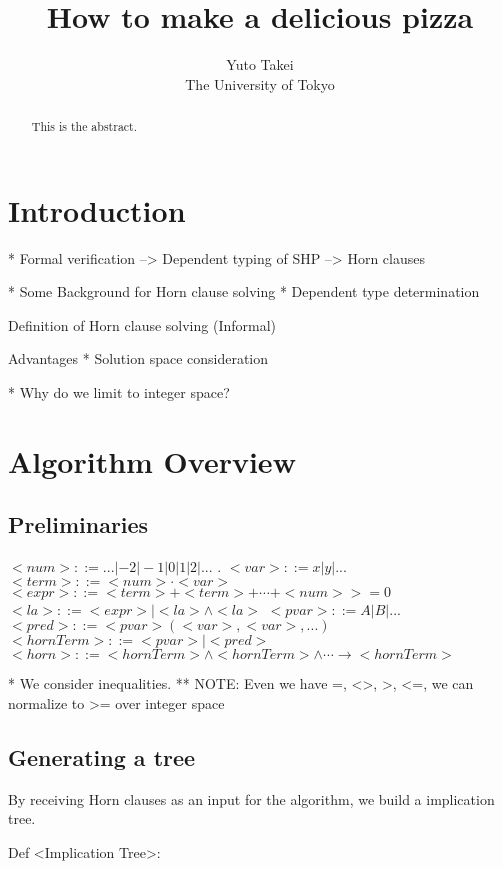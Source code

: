 \documentclass[a4paper,12pt]{article}
\title{How to make a delicious pizza}
\author{Yuto Takei \\ The University of Tokyo}
\begin{document}
\maketitle

\begin{abstract}
  This is the abstract.
\end{abstract}

\section{Introduction}

* Formal verification
--> Dependent typing of SHP
--> Horn clauses

* Some
Background for Horn clause solving
* Dependent type determination

Definition of Horn clause solving (Informal)

Advantages
* Solution space consideration


* Why do we limit to integer space?


\section{Algorithm Overview}

\subsection{Preliminaries}

$ <num> ::= ... | -2 | -1 | 0 | 1 | 2 | ... $ .
$ <var> ::= x | y | ... $
$ <term> ::= <num> \cdot <var> $
$ <expr> ::=  <term> + <term> + \cdots + <num> >= 0 $
$ <la> ::= <expr>
         | <la> \wedge <la> $
$ <pvar> ::= A | B | ... $
$ <pred> ::= <pvar> ( <var>, <var>, ... ) $
$ <hornTerm> ::= <pvar> | <pred> $
$ <horn> ::= <hornTerm> \wedge <hornTerm> \wedge \cdots \longrightarrow
         <hornTerm> $

* We consider inequalities.
** NOTE: Even we have =, <>, >, <=, we can normalize to >=
         over integer space



\subsection{Generating a tree}

By receiving Horn clauses as an input for the algorithm, we build a
implication tree.

Def <Implication Tree>:
\end{document}
